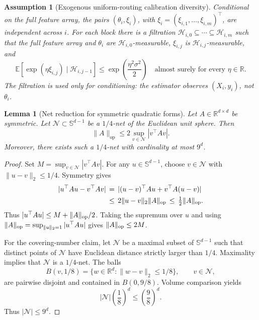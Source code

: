 \documentclass{article} %
\newtheorem{lemma}[theorem]{Lemma}
\newtheorem{assumption}{Assumption}
\begin{document}
\begin{assumption}[Exogenous uniform-routing calibration diversity]
Conditional on the full feature array, the pairs
\((\theta_i,\xi_i)\), with
\(\xi_i=(\xi_{i,1},\ldots,\xi_{i,m})^\top\), are independent across \(i\).
For each block there is a filtration
\(\mathcal H_{i,0}\subseteq\cdots\subseteq\mathcal H_{i,m}\) such that the
full feature array and \(\theta_i\) are \(\mathcal H_{i,0}\)-measurable,
\(\xi_{i,j}\) is \(\mathcal H_{i,j}\)-measurable, and
\begin{equation}
\mathbb E\!\left[
\exp(\eta\xi_{i,j})\mid\mathcal H_{i,j-1}
\right]
\leq
\exp\!\left(\frac{\eta^2\sigma^2}{2}\right)
\quad\text{almost surely for every }\eta\in\mathbb R.
\end{equation}
The filtration is used only for conditioning: the estimator observes
\((X_i,y_i)\), not \(\theta_i\).
\end{assumption}

\begin{lemma}[Net reduction for symmetric quadratic forms]
\label{lem:err-control-net-reduction-final}
Let \(A\in\mathbb{R}^{d\times d}\) be symmetric.  Let
\(\mathcal{N}\subset\mathbb{S}^{d-1}\) be a \(1/4\)-net of the Euclidean unit
sphere.  Then
\begin{equation}
\|A\|_{\mathrm{op}}
\leq
2\sup_{v\in\mathcal{N}} |v^\top A v|.
\end{equation}
Moreover, there exists such a \(1/4\)-net with cardinality at most \(9^d\).
\end{lemma}

\begin{proof}
Set \(M=\sup_{v\in\mathcal N}|v^\top Av|\). For any
\(u\in\mathbb S^{d-1}\), choose \(v\in\mathcal N\) with
\(\|u-v\|_2\leq1/4\). Symmetry gives
\begin{equation}
\begin{aligned}
|u^\top Au-v^\top Av|
&\,=\,
|(u-v)^\top Au+v^\top A(u-v)|
\\
&\,\leq\,
2\|u-v\|_2\|A\|_{\rm op}
\,\leq\,
\tfrac12\|A\|_{\rm op}.
\end{aligned}
\end{equation}
Thus \(|u^\top Au|\leq M+\|A\|_{\rm op}/2\). Taking the supremum over
\(u\) and using
\(\|A\|_{\rm op}=\sup_{\|u\|_2=1}|u^\top Au|\) gives
\(\|A\|_{\rm op}\leq2M\).

For the covering-number claim, let \(\mathcal{N}\) be a maximal subset of
\(\mathbb{S}^{d-1}\) such that distinct points of \(\mathcal{N}\) have
Euclidean distance strictly larger than \(1/4\).  Maximality implies that
\(\mathcal{N}\) is a \(1/4\)-net. The balls
\begin{equation}
B(v,1/8)=\{w\in\mathbb{R}^d:\|w-v\|_2\le 1/8\},
\qquad v\in\mathcal{N},
\end{equation}
are pairwise disjoint and contained in \(B(0,9/8)\). Volume comparison yields
\begin{equation}
|\mathcal{N}|\left(\frac18\right)^d
\leq
\left(\frac98\right)^d.
\end{equation}
Thus \(|\mathcal{N}|\le 9^d\).
\end{proof}
\end{document}
